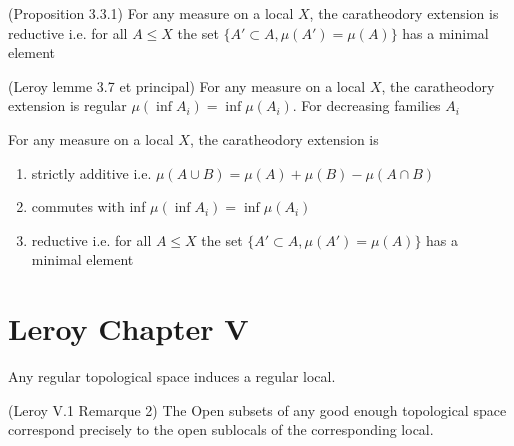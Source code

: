 \begin{proposition}[reductive]
    \label{prop:reductive}  (Proposition 3.3.1)
    For any measure on a local $X$, the caratheodory extension is
    reductive i.e. for all $A \le X$ the set $\{A' \subset A, \mu(A') = \mu(A)\}$ has a minimal element
\end{proposition}


\begin{proposition}
(Leroy lemme 3.7 et principal)
    \label{prop:commutes_with_inf}
    For any measure on a local $X$, the caratheodory extension is
    regular $\mu (\inf A_i) = \inf \mu(A_i)$. For decreasing families $A_i$
\end{proposition}

\begin{theorem}
    \label{thm:main}
    For any measure on a local $X$, the caratheodory extension is
    \begin{enumerate}
        \item strictly additive i.e. $\mu (A \cup B) = \mu(A) + \mu(B) - \mu(A \cap B)$
        \item commutes with inf $\mu (\inf A_i) = \inf \mu(A_i)$
        \item reductive i.e. for all $A \le X$ the set $\{A' \subset A, \mu(A') = \mu(A)\}$ has a minimal element
    \end{enumerate}
\end{theorem}


\chapter{Leroy Chapter V}\label{sec:leroy-chapter-v}


\begin{lemma}
    \label{lem:regular_top_to_regular_local}
    Any regular topological space induces a regular local.
\end{lemma}

\begin{lemma}[Opens]
(Leroy V.1 Remarque 2)
    \label{lem:opens_correspond}
    The Open subsets of any good enough topological space correspond precisely to the open sublocals of the corresponding local.
\end{lemma}

